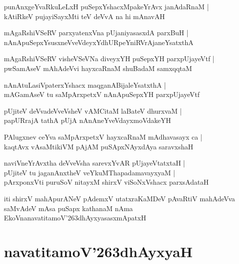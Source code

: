 \documentclass[twoside,12pt,openright]{book}
\def\S{\char'263}
\newcounter{shloka}[chapter]
\begin{document}
\begin{shloka}%
punAnxgeYvaRkuLeLxH puSepxYshacxMpakeYrAvx janAdaRnaM |\\
kAtiRkeV pujayiSayxMti teV deVvA na hi mAnavAH 
\end{shloka}

\begin{shloka}%
mAgaRshiVSeRV parxyatenxVna pUjaniyasasxdA parxBuH |\\
nAnApuSepxYsusxneVveVdeyxYdhURpeYniRVrAjaneYsatxthA 
\end{shloka}

\begin{shloka}%
mAgaRshiVSeRV visheVSeVNa diveyxYH puSepxYH parxpUjayeVtf |\\
pwSamAseV mAhAdeVvi hayxcaRnaM shuBadaM samxqqtaM 
\end{shloka}

\begin{shloka}%
nAnAtuLasiVpaterxYshacx maqganABijaleYsatxthA |\\
mAGamAseV tu saMpArxpetxV nAnApuSepxYH parxpUjayeVtf
\end{shloka}

\begin{shloka}%
pUjiteV deVvadeVveVsheV vAMCitaM laBateV dhurxvaM |\\
papURrajA tathA pUjA nAnAneYveVdayxmoVdakeYH 
\end{shloka}

\begin{shloka}%
PAlugxnev ceYva saMpArxpetxV hayxcaRnaM mAdhavasayx ca |\\
kaqtAvx vAsaMtikiVM pAjAM puSApxNAyxdAya saravxshaH 
\end{shloka}

\begin{shloka}%
naviVneYrAvxtha deVveVsha sarevxYvAR pUjayeVtatxtaH |\\
pUjiteV tu jaganAnxtheV veYkuMThapadamavayxyaM |\\
pArxponxVti puruSoV nitayxM shirxV viSoNxVshacx parxsAdataH 
\end{shloka}

\begin{center}
iti shirxV mahApurANeV pAdemxV utatxraKaMDeV pAvaRtiV mahAdeVva saMvAdeV mAsa puSapx kathanaM nAma 
EkoVnanavatitamoV\S dhAyxyasasxmApatxH 
\end{center}

\chapter{navatitamoV\S dhAyxyaH}
\end{document}

